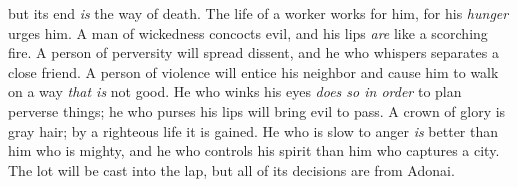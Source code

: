 \begin{biblechapter}
but its end \textit{is} the way of death.
\verse The life of a worker works for him, 
for his \textit{hunger} urges him.
\verse A man of wickedness concocts evil, 
and his lips \textit{are} like a scorching fire.
\verse A person of perversity will spread dissent, 
and he who whispers separates a close friend.
\verse A person of violence will entice his neighbor 
and cause him to walk on a way \textit{that is} not good.
\verse He who winks his eyes \textit{does so in order} to plan perverse things; 
he who purses his lips will bring evil to pass.
\verse A crown of glory is gray hair; 
by a righteous life it is gained.
\verse He who is slow to anger \textit{is} better than him who is mighty, 
and he who controls his spirit than him who captures a city.
\verse The lot will be cast into the lap, 
but all of its decisions are from Adonai.
\end{biblechapter}

